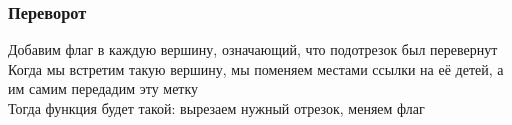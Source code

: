 \documentclass[a4paper]{article}
\begin{document}
\subsubsection{Переворот}
Добавим флаг  в каждую вершину, означающий, что подотрезок был перевернут\\[2mm]
\indent Когда мы встретим такую вершину, мы поменяем местами ссылки на её детей, а им самим передадим эту метку\\[2mm]
\indent Тогда функция  будет такой: вырезаем нужный отрезок, меняем флаг
\end{document}
